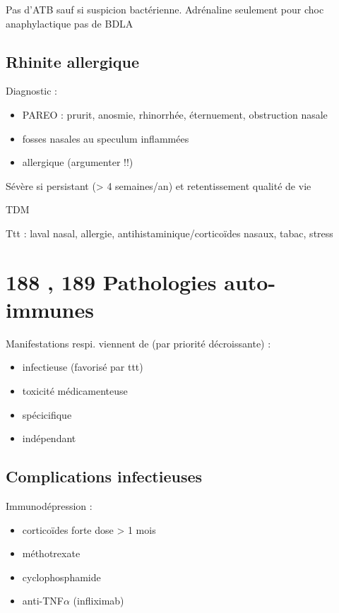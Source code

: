 \documentclass{book}
\begin{document}
Pas d'ATB sauf si suspicion bactérienne. Adrénaline seulement pour choc anaphylactique
\danger pas de BDLA 

\subsection{Rhinite allergique}
\label{sec:org954d46f}
Diagnostic :

\begin{itemize}
\item PAREO : prurit, anosmie, rhinorrhée, éternuement, obstruction nasale
\item fosses nasales au speculum inflammées
\item allergique (argumenter !!)
\end{itemize}

Sévère si persistant (> 4 semaines/an) et retentissement qualité de vie

TDM

Ttt : laval nasal, allergie, antihistaminique/corticoïdes nasaux, tabac, stress

\section{188 \textdagger{}, 189 Pathologies auto-immunes}
\label{sec:org92fb3b4}
\label{sec:pathologies_auto_immunes}

Manifestations respi. viennent de (par priorité décroissante) :

\begin{itemize}
\item infectieuse (favorisé par ttt)
\item toxicité médicamenteuse
\item spécicifique
\item indépendant
\end{itemize}


\subsection{Complications infectieuses}
\label{sec:orgcda0e15}
Immunodépression :

\begin{itemize}
\item corticoïdes forte dose > 1 mois
\item méthotrexate
\item cyclophosphamide
\item anti-TNF\(\alpha\) (infliximab)
\end{itemize}
\end{document}
